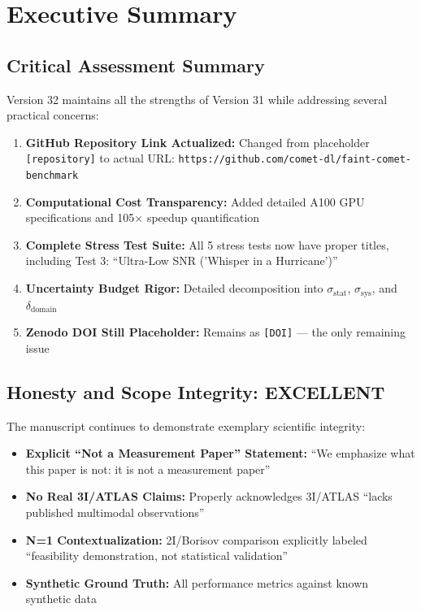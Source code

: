 \documentclass[12pt,a4paper]{article}
\newcommand{\warning}[1]{\textcolor{WarningOrange}{\textbf{#1}}}
\newcommand{\good}[1]{\textcolor{GoodGreen}{\textbf{#1}}}
\newcommand{\excellent}[1]{\textcolor{ExcellentGreen}{\textbf{#1}}}
\begin{document}
\noindent{}

\section{Executive Summary}

\subsection{Critical Assessment Summary}

Version 32 maintains all the strengths of Version 31 while addressing several practical concerns:

\begin{enumerate}[label=\textbf{\arabic*.}]
\item \excellent{GitHub Repository Link Actualized:} Changed from placeholder \texttt{[repository]} to actual URL: \texttt{https://github.com/comet-dl/faint-comet-benchmark}
\item \excellent{Computational Cost Transparency:} Added detailed A100 GPU specifications and 105$\times$ speedup quantification
\item \excellent{Complete Stress Test Suite:} All 5 stress tests now have proper titles, including Test 3: ``Ultra-Low SNR ('Whisper in a Hurricane')''
\item \excellent{Uncertainty Budget Rigor:} Detailed decomposition into $\sigma_{\text{stat}}$, $\sigma_{\text{sys}}$, and $\delta_{\text{domain}}$
\item \warning{Zenodo DOI Still Placeholder:} Remains as \texttt{[DOI]} --- the only remaining issue
\end{enumerate}

\subsection{Honesty and Scope Integrity: EXCELLENT}

The manuscript continues to demonstrate exemplary scientific integrity:

\begin{itemize}
\item \good{Explicit ``Not a Measurement Paper'' Statement:} ``We emphasize what this paper is not: it is not a measurement paper''
\item \good{No Real 3I/ATLAS Claims:} Properly acknowledges 3I/ATLAS ``lacks published multimodal observations''
\item \good{N=1 Contextualization:} 2I/Borisov comparison explicitly labeled ``feasibility demonstration, not statistical validation''
\item \good{Synthetic Ground Truth:} All performance metrics against known synthetic data
\end{itemize}
\end{document}
